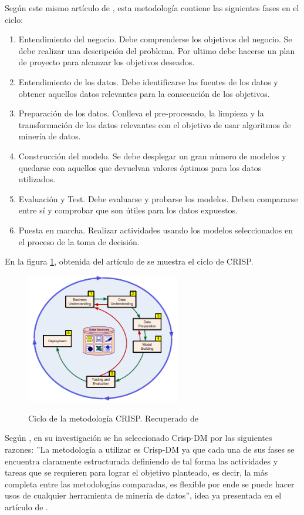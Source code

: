 Según este mismo artículo de , esta metodología contiene las siguientes fases en el ciclo:
\begin{enumerate}
	\item Entendimiento del negocio. Debe comprenderse los objetivos del negocio. Se debe realizar una descripción del problema. Por ultimo debe hacerse un plan de proyecto para alcanzar los objetivos deseados.
	\item Entendimiento de los datos. Debe identificarse las fuentes de los datos y obtener aquellos datos relevantes para la consecución de los objetivos.
	\item Preparación de los datos. Conlleva el pre-procesado, la limpieza y la transformación de los datos relevantes con el objetivo de usar algoritmos de minería de datos.
	\item Construcción del modelo. Se debe desplegar un gran número de modelos y quedarse con aquellos que devuelvan valores óptimos para los datos utilizados.
	\item Evaluación y Test. Debe evaluarse y probarse los modelos. Deben compararse entre sí y comprobar que son útiles para los datos expuestos.
	\item Puesta en marcha. Realizar actividades usando los modelos seleccionados en el proceso de la toma de decisión.
\end{enumerate}

En la figura \ref{fig:cicloCrisp}, obtenida del artículo de  se muestra el ciclo de CRISP.

\begin{figure}[htb]
	\centering
	\caption{Ciclo de la metodología CRISP. Recuperado de \protect{}}
	\includegraphics[width=0.6\textwidth]{recursos/CRISPCiclo}
	\label{fig:cicloCrisp}
\end{figure}

Según , en su investigación se ha seleccionado Crisp-DM por las siguientes razones: ''La metodología a utilizar es Crisp-DM ya que cada una de sus fases se encuentra claramente estructurada definiendo de tal forma las actividades y tareas que se requieren para lograr el objetivo planteado, es decir, la más completa entre las metodologías comparadas, es flexible por ende se puede hacer usos de cualquier herramienta de minería de datos'', idea ya presentada en el artículo de \cite{moine2011analisis}.


